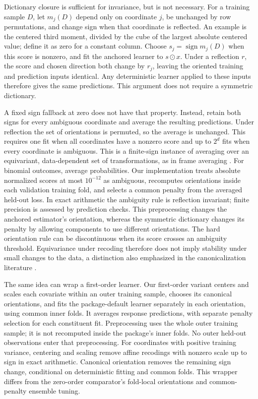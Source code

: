 \documentclass[11pt]{article}
\theoremstyle{definition}
\theoremstyle{remark}
\begin{document}
Dictionary closure is sufficient for invariance, but is not necessary.
For a training sample $D$, let $m_j(D)$ depend only on coordinate $j$, be
unchanged by row permutations, and change sign when that coordinate is
reflected. An example is the
centered third moment, divided by the cube of the largest absolute centered
value; define it as zero for a constant column. Choose $s_j=\operatorname{sign}
m_j(D)$ when this score is nonzero, and fit the anchored learner to
$s\odot x$. Under a reflection $r$, the score and chosen direction both
change by $r_j$, leaving the oriented training and prediction inputs identical.
Any deterministic learner applied to these inputs therefore gives the same
predictions. This argument does not require a symmetric dictionary.

A fixed sign fallback at zero does not have that property. Instead, retain
both signs for every ambiguous coordinate and average the resulting
predictions. Under reflection the set of orientations is permuted, so the
average is unchanged. This requires one fit when all coordinates have a
nonzero score and up to $2^d$ fits when every coordinate is ambiguous.
This is a finite-sign instance of averaging over an equivariant,
data-dependent set of transformations, as in frame averaging
\citep{puny2021}.
For binomial outcomes, average probabilities. Our implementation treats
absolute normalized scores at most $10^{-12}$ as ambiguous, recomputes
orientations inside each validation training fold, and selects a common
penalty from the averaged held-out loss. In exact arithmetic the ambiguity
rule is reflection invariant; finite precision is assessed by prediction
checks. This preprocessing changes the anchored estimator's orientation,
whereas the symmetric dictionary changes its penalty by allowing components
to use different orientations.
The hard orientation rule can be discontinuous when its score crosses an
ambiguity threshold. Equivariance under recoding therefore does not imply
stability under small changes to the data, a distinction also emphasized
in the canonicalization literature \citep{dym2024}.

The same idea can wrap a first-order learner. Our first-order variant
centers and scales each covariate within an outer training sample, chooses
its canonical orientations, and fits the package-default learner separately
in each orientation, using common inner folds. It averages response
predictions, with separate penalty selection for each constituent fit.
Preprocessing uses the whole outer training sample; it is not recomputed
inside the package's inner folds. No outer held-out observations enter that
preprocessing. For coordinates with positive training variance, centering
and scaling remove affine recodings with nonzero scale up to sign in exact
arithmetic. Canonical orientation removes the remaining sign change,
conditional on deterministic fitting and common folds. This
wrapper differs from the zero-order comparator's fold-local orientations
and common-penalty ensemble tuning.
\end{document}
